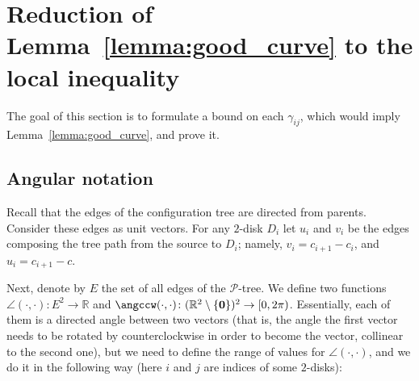 \section{Reduction of Lemma~\ref{lemma:good_curve} to the local inequality}

The goal of this section is to formulate a bound on each $\gamma_{ij}$, which would imply Lemma~\ref{lemma:good_curve}, and prove it.

\subsection{Angular notation}

Recall that the edges of the configuration tree are directed from parents. Consider these edges as unit vectors.
For any $2$-disk $D_i$ let $u_i$ and $v_i$ be the edges composing the tree path from the source to $D_i$; namely, $v_i = c_{i+1} - c_i$, and $u_i = c_{i+1} - c$.

Next, denote by $E$ the set of all edges of the $\mathcal{P}$-tree. We define two functions $\angle(\cdot, \cdot)\colon E^2\to\mathbb{R}$ and $\angccw(\cdot, \cdot)\colon (\mathbb{R}^2\setminus\{\boldsymbol{0}\})^2\to[0, 2\pi)$. Essentially, each of them is a directed angle between two vectors (that is, the angle the first vector needs to be rotated by counterclockwise in order to become the vector, collinear to the second one), but we need to define the range of values for $\angle(\cdot, \cdot)$, and we do it in the following way (here $i$ and $j$ are indices of some $2$-disks):

